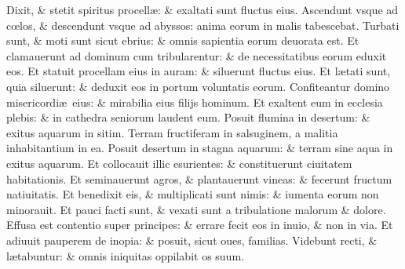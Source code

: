 \documentclass[a5paper,10pt]{book}
\def\ae{æ}
\def\oe{œ}
\begin{document}
\begin{multicols*}{2}
\newline \color{red} D\color{black}ixit, \& stetit spiritus procell\ae : \& exaltati sunt fluctus eius.
\newline \color{red} A\color{black}scendunt vsque ad c\oe los, \& descendunt vsque ad abyssos: anima eorum in malis tabescebat.
\newline \color{red} T\color{black}urbati sunt, \& moti sunt sicut ebrius: \& omnis sapientia eorum deuorata est.
\newline \color{red} E\color{black}t clamauerunt ad dominum cum tribularentur: \& de necessitatibus eorum eduxit eos.
\newline \color{red} E\color{black}t statuit procellam eius in auram: \& siluerunt fluctus eius.
\newline \color{red} E\color{black}t l\ae tati sunt, quia siluerunt: \& deduxit eos in portum voluntatis eorum.
\newline \color{red} C\color{black}onfiteantur domino misericordi\ae \ eius: \& mirabilia eius filijs hominum.
\newline \color{red} E\color{black}t exaltent eum in ecclesia plebis: \& in cathedra seniorum laudent eum.
\newline \color{red} P\color{black}osuit flumina in desertum: \& exitus aquarum in sitim.
\newline \color{red} T\color{black}erram fructiferam in salsuginem, a malitia inhabitantium in ea.
\newline \color{red} P\color{black}osuit desertum in stagna aquarum: \& terram sine aqua in exitus aquarum.
\newline \color{red} E\color{black}t collocauit illic esurientes: \& constituerunt ciuitatem habitationis.
\newline \color{red} E\color{black}t seminauerunt agros, \& plantauerunt vineas: \& fecerunt fructum natiuitatis.
\newline \color{red} E\color{black}t benedixit eis, \& multiplicati sunt nimis: \& iumenta eorum non minorauit.
\newline \color{red} E\color{black}t pauci facti sunt, \& vexati sunt a tribulatione malorum \& dolore.
\newline \color{red} E\color{black}ffusa est contentio super principes: \& errare fecit eos in inuio, \& non in via.%
\newline \color{red} E\color{black}t adiuuit pauperem de inopia: \& posuit, sicut oues, familias.
\newline \color{red} V\color{black}idebunt recti, \& l\ae tabuntur: \& omnis iniquitas oppilabit os suum.

\end{multicols*}
\end{document}
